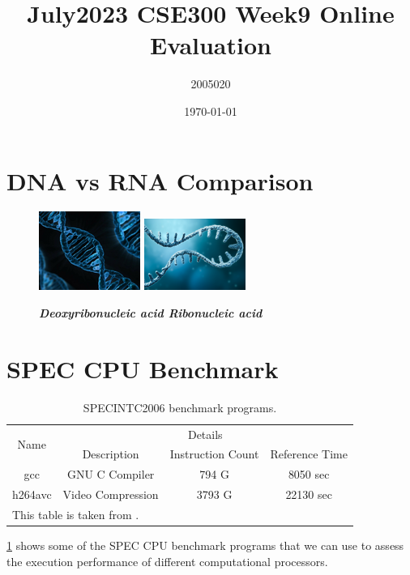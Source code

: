 \documentclass[11pt]{article}
\title{July2023 CSE300 Week9 Online Evaluation}
\author{2005020}
\date{\today}
\begin{document}
    \maketitle

\section*{DNA vs RNA Comparison} 

\begin{figure}[!h]
    \centering
    \includegraphics[scale]{Images/DNA.png}
    \includegraphics{Images/RNA.png}
    \caption{\textbf{\textit{Deoxyribonucleic acid Ribonucleic acid }}}
    \label{fig:1}
\end{figure}

\section*{SPEC CPU Benchmark}

\begin{table}[!h]
\caption{SPECINTC2006 benchmark programs.}
    \centering
    \begin{tabular}{|c|c|c|c|}
    \hline
         \multirow{2}{*}{Name} &  \multicolumn{3}{|c|}{Details} \\ \cline{2-4}
         & Description & Instruction Count &  Reference Time \\ \hline
         gcc & GNU C Compiler & 794 G & 8050 sec \\ \hline
         h264avc &  Video Compression & 3793 G & 22130 sec \\ \hline   
         \multicolumn{2}{l}{This table is taken from \cite{patterson2013computer}.} &   \multicolumn{2}{l}{}
    \end{tabular}
    \label{tab:Table 1}
\end{table}

\ref{tab:Table 1} shows some of the SPEC CPU benchmark programs that we can use to assess the execution performance of different computational processors.
\end{document}
